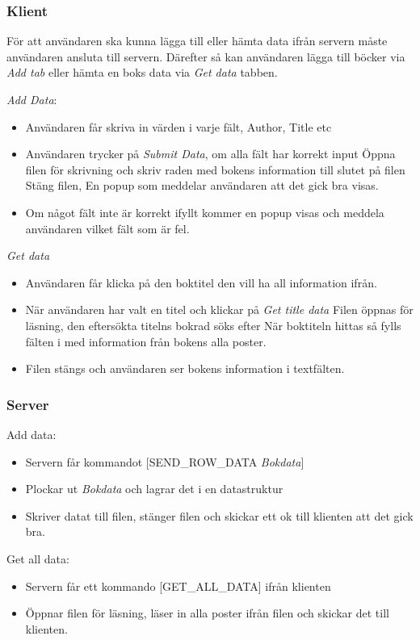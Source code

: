 \documentclass[11pt, titlepage, oneside, a4paper]{article}
\newcommand{\Subsubsection}[1]{\vspace{-4pt}\subsubsection{#1}\vspace{-8pt}}
\begin{document}
		\Subsubsection{Klient}
		För att användaren ska kunna lägga till eller hämta data ifrån servern måste användaren ansluta till servern.
	        Därefter så kan användaren lägga till böcker via \emph{Add tab} eller hämta en boks data via \emph{Get data} tabben.
	        
	        \emph{Add Data}: 
	        \begin{itemize}
	         \item Användaren får skriva in värden i varje fält, Author, Title etc
	         \item Användaren trycker på \emph{Submit Data}, om alla fält har korrekt input
	         \subitem Öppna filen för skrivning och skriv raden med bokens information till slutet på filen
	         \subitem Stäng filen, En popup som meddelar användaren att det gick bra visas.
	         \item Om något fält inte är korrekt ifyllt kommer en popup visas och meddela användaren vilket fält som är fel.
	        \end{itemize}
	        
	        \emph{Get data}
	        \begin{itemize}
	         \item Användaren får klicka på den boktitel den vill ha all information ifrån.
	         \item När användaren har valt en titel och klickar på \emph{Get title data} 
		 \subitem Filen öppnas för läsning, den eftersökta titelns bokrad söks efter
		 \subitem När boktiteln hittas så fylls fälten i med information från bokens alla poster.
		 \item Filen stängs och användaren ser bokens information i textfälten.
	        \end{itemize}


		\Subsubsection{Server}
		Add data:
		\begin{itemize}
		 \item Servern får kommandot [SEND\_ROW\_DATA \emph{Bokdata}]
		 \item Plockar ut \emph{Bokdata} och lagrar det i en datastruktur
		 \item Skriver datat till filen, stänger filen och skickar ett ok till klienten att det gick bra.
		\end{itemize}

		Get all data:
		\begin{itemize}
		 \item Servern får ett kommando [GET\_ALL\_DATA] ifrån klienten
		 \item Öppnar filen för läsning, läser in alla poster ifrån filen och skickar det till klienten.
		\end{itemize}
		
\end{document}
